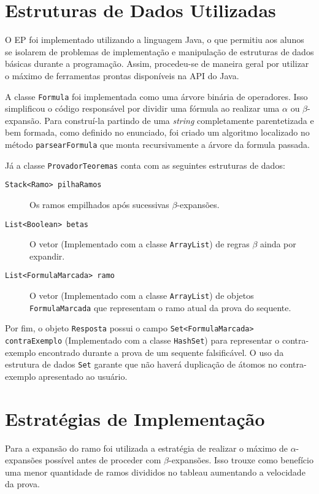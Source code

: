 \documentclass[brazil,times]{abnt}
\begin{document}
\section*{Estruturas de Dados Utilizadas}
	O EP foi implementado utilizando a linguagem Java, o que permitiu aos alunos se
	isolarem de problemas de implementação e manipulação de estruturas de dados
	básicas durante a programação. Assim, procedeu-se de maneira geral por utilizar
	o máximo de ferramentas prontas disponíveis na API do Java.
	
	A classe \texttt{Formula} foi implementada como uma árvore binária de
	operadores. Isso simplificou o código responsável por dividir uma fórmula ao
	realizar uma $\alpha$ ou $\beta$-expansão. Para construí-la partindo de uma
	\textit{string} completamente parentetizada e bem formada, como definido no
	enunciado, foi criado um algoritmo localizado no método \texttt{parsearFormula}
	que monta recursivamente a árvore da formula passada.
	
	Já a classe \texttt{ProvadorTeoremas} conta com as seguintes estruturas de
	dados: 	
	\begin{description}
		\item[\texttt{Stack<Ramo> pilhaRamos}] Os ramos empilhados após sucessivas 
		$\beta$-expansões.
		\item[\texttt{List<Boolean> betas}] O vetor (Implementado com a classe
		\texttt{ArrayList}) de regras $\beta$ ainda por expandir.
		\item[\texttt{List<FormulaMarcada> ramo}] O vetor (Implementado com a classe
		\texttt{ArrayList}) de objetos \texttt{FormulaMarcada} que representam o
		ramo atual da prova do sequente.  
	\end{description}

	Por fim, o objeto \texttt{Resposta} possui o campo \texttt{Set<FormulaMarcada>
	contraExemplo} (Implementado com a classe \texttt{HashSet}) para representar o
	contra-exemplo encontrado durante a prova de um sequente falsificável. O uso da
	estrutura de dados \texttt{Set} garante que não haverá duplicação de átomos no
	contra-exemplo apresentado ao usuário.
	
\section*{Estratégias de Implementação}
	Para a expansão do ramo foi utilizada a estratégia de realizar o máximo de
	$\alpha$-expansões possível antes de proceder com $\beta$-expansões. Isso
	trouxe como benefício uma menor quantidade de ramos divididos no tableau
	aumentando a velocidade da prova.
	
\end{document}
